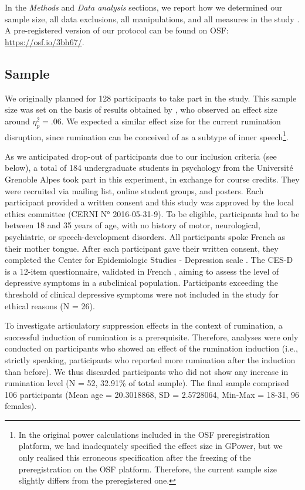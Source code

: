 \documentclass[12pt,]{book}
\let\rmarkdownfootnote\footnote%
\def\footnote{\protect\rmarkdownfootnote}
\begin{document}
In the \emph{Methods} and \emph{Data analysis} sections, we report how
we determined our sample size, all data exclusions, all manipulations,
and all measures in the study \citep{Simmons2012}. A pre-registered
version of our protocol can be found on OSF:
\url{https://osf.io/3bh67/}.

\subsection{Sample}\label{sample}

We originally planned for 128 participants to take part in the study.
This sample size was set on the basis of results obtained by
\citet{Topolinski2009}, who observed an effect size around
\(\eta_{p}^{2}=.06\). We expected a similar effect size for the current
rumination disruption, since rumination can be conceived of as a subtype
of inner speech\footnote{In the original power calculations included in
  the OSF preregistration platform, we had inadequately specified the
  effect size in GPower, but we only realised this erroneous
  specification after the freezing of the preregistration on the OSF
  platform. Therefore, the current sample size slightly differs from the
  preregistered one.}.

As we anticipated drop-out of participants due to our inclusion criteria
(see below), a total of 184 undergraduate students in psychology from
the Université Grenoble Alpes took part in this experiment, in exchange
for course credits. They were recruited via mailing list, online student
groups, and posters. Each participant provided a written consent and
this study was approved by the local ethics committee (CERNI N°
2016-05-31-9). To be eligible, participants had to be between 18 and 35
years of age, with no history of motor, neurological, psychiatric, or
speech-development disorders. All participants spoke French as their
mother tongue. After each participant gave their written consent, they
completed the Center for Epidemiologic Studies - Depression scale
\citep[CES-D;][]{Radloff1977a}. The CES-D is a 12-item questionnaire,
validated in French \citep{Morin2011}, aiming to assess the level of
depressive symptoms in a subclinical population. Participants exceeding
the threshold of clinical depressive symptoms \citep[i.e.,
\textgreater{}23 for females and \textgreater{}17 for
males;][]{Radloff1977a} were not included in the study for ethical
reasons (N = 26).

To investigate articulatory suppression effects in the context of
rumination, a successful induction of rumination is a prerequisite.
Therefore, analyses were only conducted on participants who showed an
effect of the rumination induction (i.e., strictly speaking,
participants who reported more rumination after the induction than
before). We thus discarded participants who did not show any increase in
rumination level (N = 52, 32.91\% of total sample). The final sample
comprised 106 participants (Mean age = 20.3018868, SD = 2.5728064,
Min-Max = 18-31, 96 females).
\end{document}
